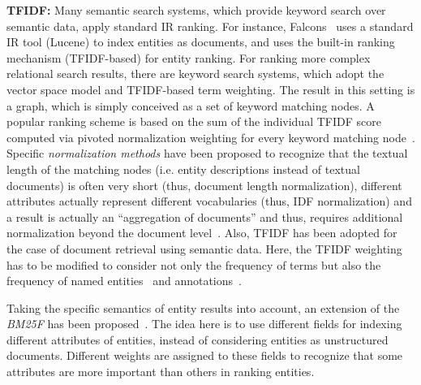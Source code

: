 \textbf{TFIDF:} Many semantic search systems, which provide keyword search over semantic data, apply standard IR ranking. For instance, Falcons~\cite{DBLP:journals/ijswis/ChengQ09} uses a standard IR tool (Lucene) to index entities as documents, and uses the built-in ranking mechanism (TFIDF-based) for entity ranking.  For ranking more complex relational search results, there are keyword search systems, which adopt the vector space model and TFIDF-based term weighting. The result in this setting is a graph, which is simply conceived as a set of keyword matching nodes. A popular ranking scheme is based on the sum of the individual TFIDF score computed via pivoted normalization weighting for every keyword matching node~\cite{DBLP:conf/icde/TranWRC09}. Specific \emph{normalization methods} have been proposed to recognize that the textual length of the matching nodes (i.e. entity descriptions instead of textual documents) is often very short (thus, document length normalization), different attributes actually represent different vocabularies (thus, IDF normalization) and a result is actually an ``aggregation of documents'' and thus, requires additional normalization beyond the document level~\cite{DBLP:conf/sigmod/LiuYMC06}. Also, TFIDF has been adopted for the case of document retrieval using semantic data. Here, the TFIDF weighting has to be modified to consider not only the frequency of terms but also the frequency of named entities~\cite{DBLP:series/sci/NgoC10} and annotations~\cite{DBLP:journals/tkde/CastellsFV07}.  

Taking the specific semantics of entity results into account, an extension of the \emph{BM25F} has been proposed~\cite{DBLP:conf/semweb/BlancoMV11}. The idea here is to use different fields for indexing different attributes of entities, instead of considering entities as unstructured documents. Different weights are assigned to these fields to recognize that some attributes are more important than others in ranking entities. 

